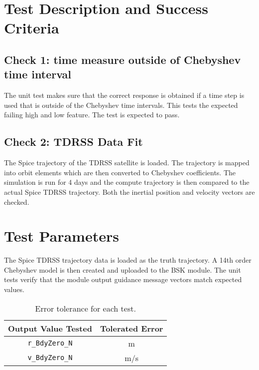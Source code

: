 
\section{Test Description and Success Criteria}

\subsection{Check 1: time measure outside of Chebyshev time interval}
The unit test makes sure that the correct response is obtained if a time step is used that is outside of the Chebyshev time intervals.  This tests the expected failing high and low feature.  The test is expected to pass.


\subsection{Check 2: TDRSS Data Fit }
The Spice trajectory of the TDRSS satellite is loaded.  The trajectory is mapped into orbit elements which are then converted to Chebyshev coefficients.  The simulation is run for 4 days and the compute trajectory is then compared to the actual Spice TDRSS trajectory.  Both the inertial position and velocity vectors are checked.




\section{Test Parameters}

The Spice TDRSS trajectory data is loaded as the truth trajectory.  A 14th order Chebyshev model is then created and uploaded to the BSK module.  
The unit tests verify that the module output guidance message vectors match expected values.
\begin{table}[htbp]
	\caption{Error tolerance for each test.}
	\label{tab:errortol}
	\centering \fontsize{10}{10}\selectfont
	\begin{tabular}{ c | c } %
		\hline\hline
		\textbf{Output Value Tested}  & \textbf{Tolerated Error}  \\ 
		\hline
		{\tt r\_BdyZero\_N}        &  m	   \\ 
		{\tt v\_BdyZero\_N}        &  m/s   \\ 
		\hline\hline
	\end{tabular}
\end{table}




